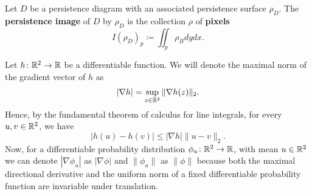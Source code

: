 \begin{definition}
    Let $ D $ be a persistence diagram with an associated persistence surface $ \rho_D $. The {\bf persistence image} of $ D $ by $ \rho_D $ is the collection $ \rho $ of {\bf pixels}
    \begin{equation}
        I(\rho_D)_p \coloneq \iint_p \rho_B dy dx.
    \end{equation}
\end{definition}

Let $ h \colon \mathbb R^2 \to \mathbb R $ be a differentiable function. We will denote the maximal norm of the gradient vector of $ h $ as
\begin{equation}
    |\nabla h | = \sup_{z \in \mathbb R^2} \| \nabla h(z) \|_2.
\end{equation}
Hence, by the fundamental theorem of calculus for line integrals, for every $ u, v \in \mathbb R^2 $, we have
\begin{equation}
    |h(u) - h(v)| \leq |\nabla h| \|u-v\|_2.
\end{equation}
Now, for a differentiable probability distribution $ \phi_u \colon \mathbb R^2 \to \mathbb R $, with mean $ u \in \mathbb R^2 $ we can denote $ |\nabla \phi_u| $ as $ |\nabla \phi| $ and $ \|\phi_u\| $ as $ \|\phi\| $ because both the maximal directional derivative and the uniform norm of a fixed differentiable probability function are invariable under translation.

